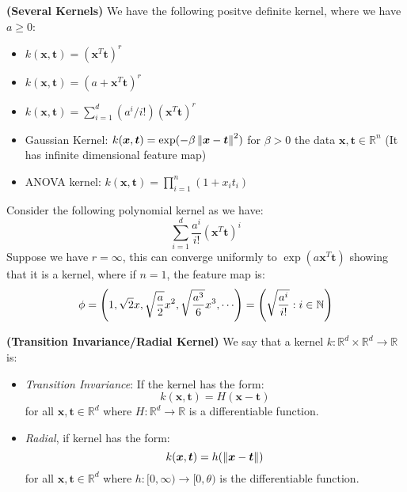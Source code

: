 \begin{remark}{\textbf{(Several Kernels)}}
    We have the following positve definite kernel, where we have $a\ge 0$:
    \begin{itemize}
        \item $k(\boldsymbol x, \boldsymbol t) = (\boldsymbol x^T\boldsymbol t)^r$
        \item $k(\boldsymbol x, \boldsymbol t) = (a + \boldsymbol x^T\boldsymbol t)^r$
        \item $k(\boldsymbol x, \boldsymbol t) = \sum^d_{i=1}(a^i/i!)(\boldsymbol x^T\boldsymbol t)^r$
        \item Gaussian Kernel: $k(\boldsymbol x, \boldsymbol t) = \exp(-\beta\left\lVert\boldsymbol x - \boldsymbol t\right\rVert^2)$ for $\beta>0$ the data $\boldsymbol x, \boldsymbol t \in \mathbb{R}^n$ (It has infinite dimensional feature map)
        \item ANOVA kernel: $k(\boldsymbol x, \boldsymbol t) = \prod^n_{i=1}(1 + x_it_i)$
    \end{itemize}
\end{remark}

\begin{remark}
    Consider the following polynomial kernel as we have:
    \begin{equation*}
        \sum^d_{i=1} \frac{a^i}{i!}(\boldsymbol x^T\boldsymbol t)^i
    \end{equation*}
    Suppose we have $r=\infty$, this can converge uniformly to $\exp(a\boldsymbol x^T\boldsymbol t)$ showing that it is a kernel, where if $n=1$, the feature map is:
    \begin{equation*}
        \phi = \bracka{1 , \sqrt{2} x, \sqrt{\frac{a}{2}}x^2, \sqrt{\frac{a^3}{6}}x^3, \cdots} = \bracka{\sqrt{\frac{a^i}{i!}} : i \in \mathbb{N}}
    \end{equation*}
\end{remark}

\begin{definition}{\textbf{(Transition Invariance/Radial Kernel)}}
    We say that a kernel $k : \mathbb{R}^d \times \mathbb{R}^d \rightarrow \mathbb{R}$ is:
    \begin{itemize}
        \item \emph{Transition Invariance}: If the kernel has the form:
        \begin{equation*}
            k(\boldsymbol x, \boldsymbol t) = H(\boldsymbol x - \boldsymbol t)
        \end{equation*}
        for all $\boldsymbol x, \boldsymbol t \in \mathbb{R}^d$ where $H : \mathbb{R}^d \rightarrow \mathbb{R}$ is a differentiable function. 
        \item \emph{Radial}, if kernel has the form:
        \begin{equation*}
            k(\boldsymbol x, \boldsymbol t) = h(\left\lVert\boldsymbol x- \boldsymbol t\right\rVert)
        \end{equation*}
        for all $\boldsymbol x, \boldsymbol t \in \mathbb{R}^d$ where $h : [0, \infty)\rightarrow [0, \theta)$ is the differentiable function. 
    \end{itemize}
\end{definition}

